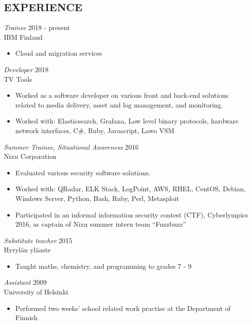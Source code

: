 \documentclass[margin, 10pt]{res} %
\begin{document}
\begin{resume}

%
%

 
\section{EXPERIENCE}
  
{\sl Trainee} \hfill 2018 - present\\
IBM Finland
\begin{itemize} \itemsep -2pt %
\item Cloud and migration services
\end{itemize}

\addvspace{-7pt}
{\sl Developer} \hfill 2018 \\
TV Tools
\begin{itemize} \itemsep -2pt %
\item Worked as a software developer on various front and back-end solutions related to media delivery, asset and log management, and monitoring.
\item Worked with: Elasticsearch, Grafana, Low level binary protocols, hardware network interfaces, C\#, Ruby, Javascript, Lawo VSM
\end{itemize}

\addvspace{-7pt}
{\sl Summer Trainee, Situational Awareness} \hfill 2016\\
Nixu Corporation
\begin{itemize} \itemsep -2pt %
\item Evaluated various security software solutions.
\item Worked with: QRadar, ELK Stack, LogPoint, AWS, RHEL, CentOS, Debian, Windows Server, Python, Bash, Ruby, Perl, Metasploit
\item Participated in an informal information security contest (CTF), Cyberlympics 2016, as captain of Nixu summer intern team ``Fuzzbuzz''  
\end{itemize}

\addvspace{-7pt}
{\sl Substitute teacher} \hfill 2015\\
Hyrylän yläaste
\begin{itemize} \itemsep -2pt %
\item Taught maths, chemistry, and programming to grades 7 - 9
\end{itemize}
\addvspace{-7pt}
{\sl Assistant} \hfill 2009\\
University of Helsinki
\begin{itemize} \itemsep -2pt %
\item Performed two weeks' school related work practise at the Department of Finnish
\end{itemize}
  

\end{resume}
\end{document}
